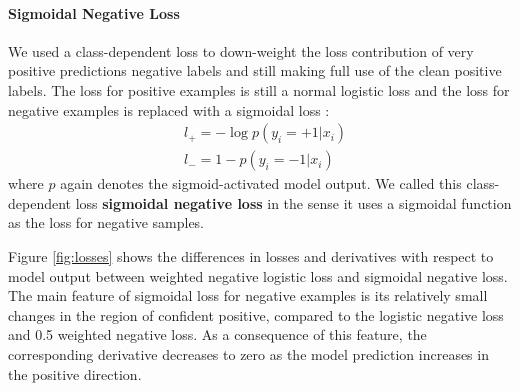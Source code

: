 \paragraph{Sigmoidal Negative Loss}
We used a class-dependent loss to down-weight the loss contribution of very positive predictions negative labels and still making full use of the clean positive labels.
The loss for positive examples is still a normal logistic loss and the loss for negative examples is replaced with a sigmoidal loss \cite{tax2016class}:
\begin{equation*}
  \begin{aligned}
    & l_{+} = - \log p(y_i=+1 \vert x_i) \\
    & l_{-} = 1 - p(y_i=-1|x_i)
  \end{aligned}
\end{equation*}
where $p$ again denotes the sigmoid-activated model output.
We called this class-dependent loss \textbf{sigmoidal negative loss} in the sense it uses a sigmoidal function as the loss for negative samples.

Figure \ref{fig:losses} shows the differences in losses and derivatives with respect to model output between weighted negative logistic loss and sigmoidal negative loss.
The main feature of sigmoidal loss for negative examples is its relatively small changes in the region of confident positive, compared to the logistic negative loss and 0.5 weighted negative loss.
As a consequence of this feature, the corresponding derivative decreases to zero as the model prediction increases in the positive direction.



